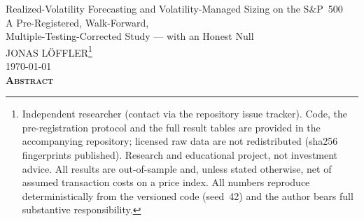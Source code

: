 \documentclass[12pt,a4paper]{article}
\begin{document}
\thispagestyle{empty}
\begin{center}
\vspace*{2.3cm}
{\fontsize{17}{21}\selectfont Realized-Volatility Forecasting and Volatility-Managed Sizing on the S\&P~500}\\[0.5cm]
{\fontsize{14}{18}\selectfont A Pre-Registered, Walk-Forward,\\[2mm]
Multiple-Testing-Corrected Study --- with an Honest Null}\\[1.8cm]
{\normalsize JONAS L\"OFFLER\renewcommand{\thefootnote}{$*$}\footnote{Independent researcher
(contact via the repository issue tracker). Code, the pre-registration protocol and the full result tables
are provided in the accompanying repository; licensed raw data are not redistributed (sha256
fingerprints published). Research and educational project, not investment advice. All results are
out-of-sample and, unless stated otherwise, net of assumed transaction costs on a price index.
All
numbers reproduce deterministically from the versioned code (seed~42) and the author bears full
substantive responsibility.}}\\[0.9cm]
{\normalsize \today}\\[1.7cm]
{\normalsize\textbf{\textsc{Abstract}}}
\end{center}
\end{document}
